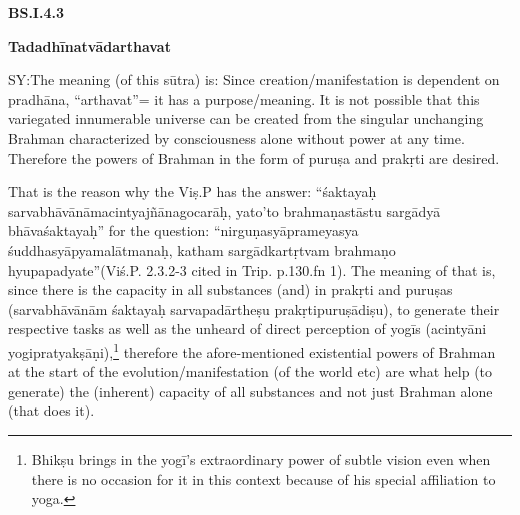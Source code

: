 
\vskip 4pt

\textbf{BS.I.4.3}

\vskip 4pt

\textbf{Tadadhīnatvādarthavat}

\vskip 4pt

SY:The meaning (of this sūtra) is: Since creation/manifestation is dependent on pradhāna, “arthavat”= it has a purpose/meaning. It is not possible that this variegated innumerable universe can be created from the singular unchanging Brahman characterized by consciousness alone without power at any time. Therefore the powers of Brahman in the form of puruṣa and prakṛti are desired.

\vskip 4pt

That is the reason why the Viṣ.P has the answer: “śaktayaḥ sarvabhāvānāmacintyajñānagocarāḥ, yato’to brahmaṇastāstu sargādyā bhāvaśaktayaḥ” for the question: “nirguṇasyāprameyasya śuddhasyāpyamalātmanaḥ, katham sargādkartṛtvam brahmaṇo hyupapadyate”\break (Viś.P. 2.3.2-3 cited in Trip. p.130.fn 1). The meaning of that is, since there is the capacity in all substances (and) in prakṛti and puruṣas (sarvabhāvānām śaktayaḥ sarvapadārtheṣu prakṛtipuruṣādiṣu), to generate their respective tasks as well as the unheard of direct perception of yogīs (acintyāni yogipratyakṣāṇi),\footnote{Bhikṣu brings in the yogī’s extraordinary power of subtle vision even when there is no occasion for it in this context because of his special affiliation to yoga.} therefore the afore-mentioned existential powers of Brahman at the start of the evolution/manifesta\-tion (of the world etc) are what help (to generate) the (inherent) capacity of all substances and not just Brahman alone (that does it).

\vskip 4pt


